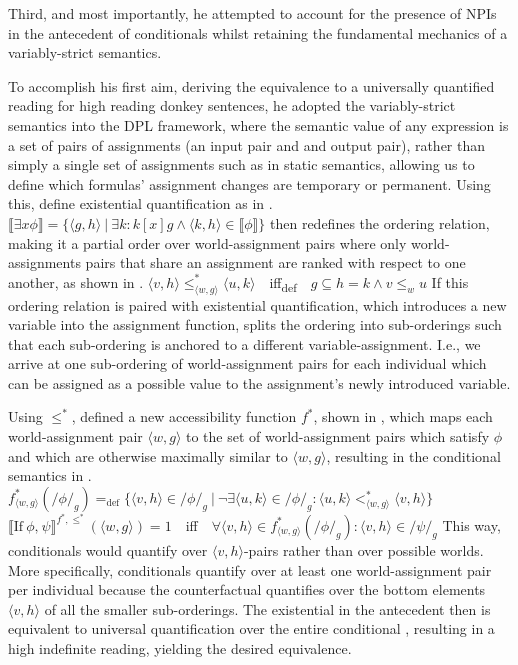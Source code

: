 Third, and most importantly, he attempted to account for the presence of NPIs in the antecedent of conditionals whilst retaining the fundamental mechanics of a variably-strict semantics. 

To accomplish his first aim, deriving the equivalence to a universally quantified reading for high reading donkey sentences, he adopted the variably-strict semantics into the DPL framework, where the semantic value of any expression is a set of pairs of assignments (an input pair and and output pair), rather than simply a single set of assignments such as in static semantics, allowing us to define which formulas' assignment changes are temporary or permanent. Using this, \textcite{Groenendijk1991} define existential quantification as in .
\ex
$\llbracket\exists x\phi\rrbracket=\{\langle g,h\rangle~|~\exists k:k[x]g\land\langle k,h\rangle\in\llbracket\phi\rrbracket\}$
\xe
\textcite{vanRooij2006} then redefines the ordering relation, making it a partial order over world-assignment pairs where only world-assignments pairs that share an assignment are ranked with respect to one another, as shown in .
\ex
{}
$\langle v,h\rangle\leqslant^*_{\langle w,g\rangle}\langle u,k\rangle$~~iff\textsubscript{def}~~$g\subseteq h=k\land v\leqslant_w u$
\xe
If this ordering relation is paired with existential quantification, which introduces a new variable into the assignment function, splits the ordering into sub-orderings such that each sub-ordering is anchored to a different variable-assignment. I.e., we arrive at one sub-ordering of world-assignment pairs for each individual which can be assigned as a possible value to the assignment's newly introduced variable.

Using $\leqslant^*$, \textcite{vanRooij2006} defined a new accessibility function $f^*$, shown in , which maps each world-assignment pair $\langle w,g\rangle$ to the set of world-assignment pairs which satisfy $\phi$ and which are otherwise maximally similar to $\langle w,g\rangle$, resulting in the conditional semantics in .
\pex
\a $f^*_{\langle w,g\rangle}(/\phi/_g)=_\text{def}\{\langle v,h\rangle\in/\phi/_g~|~\neg\exists\langle u,k\rangle\in/\phi/_g:\langle u,k\rangle<^*_{\langle w,g\rangle}\langle v,h\rangle\}$
\a $\llbracket\text{If}~\phi\text{,}~\psi\rrbracket^{f^*,\leqslant^*}(\langle w,g\rangle)=1$~~iff~~$\forall\langle v,h\rangle\in f^*_{\langle w,g\rangle}(/\phi/_g):\langle v,h\rangle\in/\psi/_g$
\xe
This way, conditionals would quantify over $\langle v,h\rangle$-pairs rather than over possible worlds. More specifically, conditionals quantify over at least one world-assignment pair per individual because the counterfactual quantifies over the bottom elements $\langle v,h\rangle$ of all the smaller sub-orderings. The existential in the antecedent then is equivalent to universal quantification over the entire conditional \parencite[see][]{Schubert1987}, resulting in a high indefinite reading, yielding the desired equivalence.

